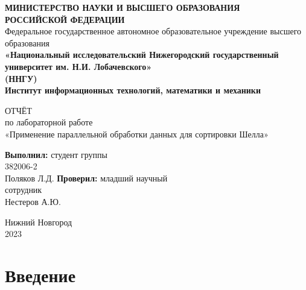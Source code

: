 \documentclass{article}
\date{}
\title{}
\author{}
\begin{document}
\begin{titlepage}
\begin{center}
    {\bfseries МИНИСТЕРСТВО НАУКИ И ВЫСШЕГО ОБРАЗОВАНИЯ \\
        РОССИЙСКОЙ ФЕДЕРАЦИИ}\\Федеральное государственное автономное образовательное учреждение высшего образования\\
    {\bfseries «Национальный исследовательский Нижегородский государственный университет им. Н.И. Лобачевского»\\(ННГУ)\\Институт информационных технологий, математики и механики} \\
\end{center}
\vspace{8em}
\begin{center}
    ОТЧЁТ\\ по лабораторной работе \\«Применение параллельной обработки данных для сортировки Шелла»
\end{center}
\vspace{5em}
\begin{flushright}
    {\bfseries Выполнил:} студент группы\\382006-2\\Поляков Л.Д.\underline{\hspace{3cm}} \linebreak\linebreak\linebreak
    {\bfseries Проверил:} младший научный\\сотрудник\\Нестеров А.Ю. \underline{\hspace{3cm}} 
\end{flushright}
\vspace{\fill}
\begin{center}
    Нижний Новгород\\2023
\end{center}
\end{titlepage}
\tableofcontents
\thispagestyle{empty}
\newpage

\pagestyle{plain}
\setcounter{page}{3}
\maketitle

\section{Введение}
\end{document}
